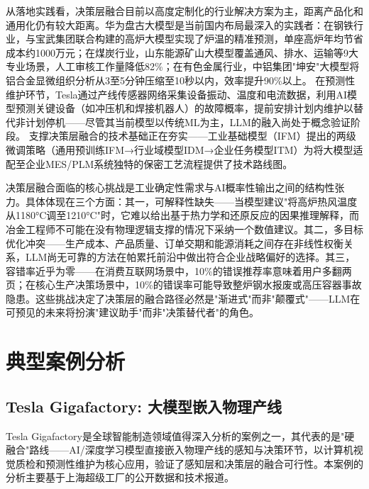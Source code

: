 \documentclass[12pt,a4paper]{ctexart}
\begin{document}
从落地实践看，决策层融合目前以高度定制化的行业解决方案为主，距离产品化和通用化仍有较大距离。华为盘古大模型是当前国内布局最深入的实践者\cite{huawei2025pangu}：在钢铁行业，与宝武集团联合构建的高炉大模型实现了炉温的精准预测，单座高炉年均节省成本约1000万元；在煤炭行业，山东能源矿山大模型覆盖通风、排水、运输等9大专业场景，人工审核工作量降低82\%；在有色金属行业，中铝集团"坤安"大模型将铝合金显微组织分析从3至5分钟压缩至10秒以内，效率提升90\%以上。\cite{huawei2025pangu} 在预测性维护环节，Tesla通过产线传感器网络采集设备振动、温度和电流数据，利用AI模型预测关键设备（如冲压机和焊接机器人）的故障概率，提前安排计划内维护以替代非计划停机——尽管其当前模型以传统ML为主，LLM的融入尚处于概念验证阶段。\cite{aicadium2024tesla} 支撑决策层融合的技术基础正在夯实——工业基础模型（IFM）提出的两级微调策略（通用预训练IFM→行业域模型IDM→企业任务模型ITM）为将大模型适配至企业MES/PLM系统独特的保密工艺流程提供了技术路线图。\cite{jms2025ifm}

决策层融合面临的核心挑战是工业确定性需求与AI概率性输出之间的结构性张力。具体体现在三个方面：其一，可解释性缺失——当模型建议"将高炉热风温度从1180°C调至1210°C"时，它难以给出基于热力学和还原反应的因果推理解释，而冶金工程师不可能在没有物理逻辑支撑的情况下采纳一个数值建议。其二，多目标优化冲突——生产成本、产品质量、订单交期和能源消耗之间存在非线性权衡关系，LLM尚无可靠的方法在帕累托前沿中做出符合企业战略偏好的选择。其三，容错率近乎为零——在消费互联网场景中，10\%的错误推荐率意味着用户多翻两页；在核心生产决策场景中，10\%的错误率可能导致整炉钢水报废或高压容器事故隐患。这些挑战决定了决策层的融合路径必然是"渐进式"而非"颠覆式"——LLM在可预见的未来将扮演"建议助手"而非"决策替代者"的角色。

\section{典型案例分析}

\subsection{Tesla Gigafactory: 大模型嵌入物理产线}

Tesla Gigafactory是全球智能制造领域值得深入分析的案例之一，其代表的是"硬融合"路线——AI/深度学习模型直接嵌入物理产线的感知与决策环节，以计算机视觉质检和预测性维护为核心应用，验证了感知层和决策层的融合可行性。本案例的分析主要基于上海超级工厂的公开数据和技术报道。
\end{document}
